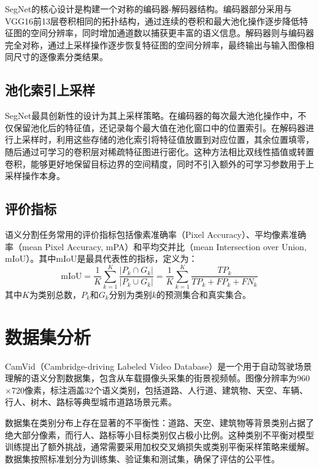 \documentclass[12pt,a4paper]{article}
\begin{document}
SegNet的核心设计是构建一个对称的编码器-解码器结构。编码器部分采用与VGG16前13层卷积相同的拓扑结构，通过连续的卷积和最大池化操作逐步降低特征图的空间分辨率，同时增加通道数以捕获更丰富的语义信息。解码器则与编码器完全对称，通过上采样操作逐步恢复特征图的空间分辨率，最终输出与输入图像相同尺寸的逐像素分类结果。

\subsection{池化索引上采样}

SegNet最具创新性的设计为其上采样策略。在编码器的每次最大池化操作中，不仅保留池化后的特征值，还记录每个最大值在池化窗口中的位置索引。在解码器进行上采样时，利用这些存储的池化索引将特征值放置到对应位置，其余位置填零，随后通过可学习的卷积层对稀疏特征图进行密化。这种方法相比双线性插值或转置卷积，能够更好地保留目标边界的空间精度，同时不引入额外的可学习参数用于上采样操作本身。

\subsection{评价指标}

语义分割任务常用的评价指标包括像素准确率（Pixel Accuracy）、平均像素准确率（mean Pixel Accuracy, mPA）和平均交并比（mean Intersection over Union, mIoU）。其中mIoU是最具代表性的指标，定义为：
\begin{equation}
\text{mIoU} = \frac{1}{K}\sum_{k=1}^{K}\frac{|P_k \cap G_k|}{|P_k \cup G_k|} = \frac{1}{K}\sum_{k=1}^{K}\frac{TP_k}{TP_k + FP_k + FN_k}
\end{equation}
其中$K$为类别总数，$P_k$和$G_k$分别为类别$k$的预测集合和真实集合。

\section{数据集分析}

CamVid（Cambridge-driving Labeled Video Database）是一个用于自动驾驶场景理解的语义分割数据集，包含从车载摄像头采集的街景视频帧。图像分辨率为960$\times$720像素，标注涵盖32个语义类别，包括道路、人行道、建筑物、天空、车辆、行人、树木、路标等典型城市道路场景元素。

数据集在类别分布上存在显著的不平衡性：道路、天空、建筑物等背景类别占据了绝大部分像素，而行人、路标等小目标类别仅占极小比例。这种类别不平衡对模型训练提出了额外挑战，通常需要采用加权交叉熵损失或类别平衡采样策略来缓解。数据集按照标准划分为训练集、验证集和测试集，确保了评估的公平性。
\end{document}
